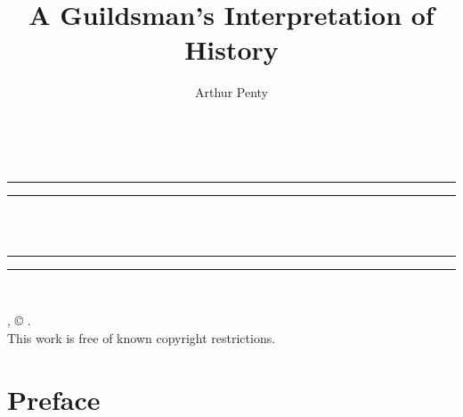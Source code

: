 \documentclass{book}
\date{}
\title{A Guildsman’s Interpretation of History}
\author{Arthur Penty}
\begin{document}
\thispagestyle{empty}
\begin{center}
	{\Huge \@title   \\[5mm]}
\end{center}
\newpage
\thispagestyle{empty}
\cleardoublepage
\begin{center}
	\thispagestyle{empty}
	\vspace*{\baselineskip}
	\rule{\textwidth}{1.6pt}\vspace*{-\baselineskip}\vspace*{2pt}
	\rule{\textwidth}{0.4pt}\\[\baselineskip]
	{\Huge\scshape \@title   \\[5mm]}
	{\Large }
	\rule{\textwidth}{0.4pt}\vspace*{-\baselineskip}\vspace{3.2pt}
	\rule{\textwidth}{1.6pt}\\[\baselineskip]
	\vspace*{4\baselineskip}
	{\Large \@author}
	\vfill
\end{center}
\pagebreak
\newpage
\thispagestyle{empty}
\null\vfill
\noindent
\begin{center}
	{\emph{\@title}, © \@author.\\[5mm]}
	{This work is free of known copyright restrictions.\\[5mm]}
\end{center}
\pagebreak
\newpage
\setcounter{tocdepth}{0}
\setcounter{secnumdepth}{0}
\chapter*{Preface}
\end{document}
